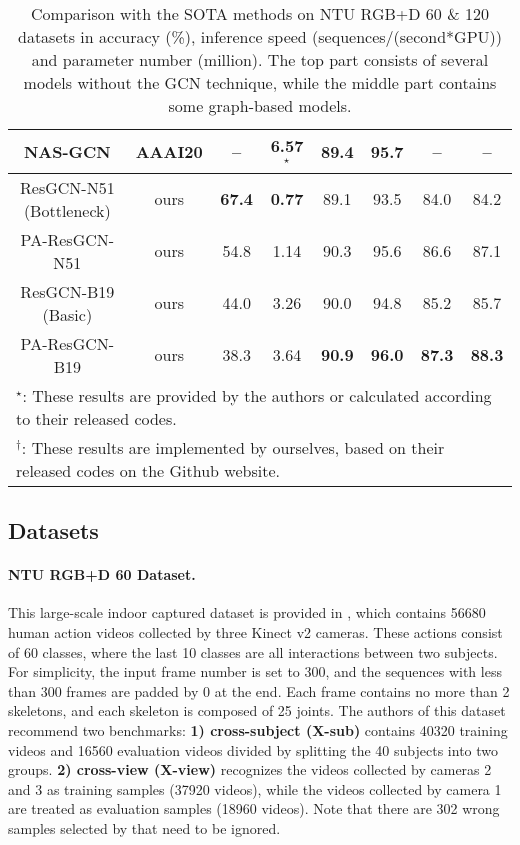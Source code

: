 \documentclass[sigconf]{acmart}
\begin{document}
\begin{table*}
\begin{center}
\begin{tabular}{cc|cc|cc|cc}
  NAS-GCN \cite{peng2020learning} & AAAI20 & -- & 6.57$^\star$ & 89.4 & 95.7 & -- & -- \\
  \hline
  \hline
  ResGCN-N51 (Bottleneck) & ours & {\bf 67.4} & {\bf 0.77} & 89.1 & 93.5 & 84.0 & 84.2 \\
  PA-ResGCN-N51 & ours & 54.8 & 1.14 & 90.3 & 95.6 & 86.6 & 87.1 \\
  \hline
  ResGCN-B19 (Basic) & ours & 44.0 & 3.26 & 90.0 & 94.8 & 85.2 & 85.7 \\
  PA-ResGCN-B19 & ours & 38.3 & 3.64 & {\bf 90.9} & {\bf 96.0} & {\bf 87.3} & {\bf 88.3} \\
  \hline
  \multicolumn{8}{l}{$^\star$: These results are provided by the authors or calculated according to their released codes.}\\
  \multicolumn{8}{l}{$^\dagger$: These results are implemented by ourselves, based on their released codes on the Github website.}\\
  \end{tabular}
  \end{center}
  \caption{Comparison with the SOTA methods on NTU RGB+D 60 \& 120 datasets in accuracy (\%), inference speed (sequences/(second*GPU)) and parameter number (million). The top part consists of several models without the GCN technique, while the middle part contains some graph-based models.}\label{tab:ntu}
  \vspace{-0.6cm}
\end{table*}

\subsection{Datasets}
\label{ssec:datasets}

\paragraph{NTU RGB+D 60 Dataset.} This large-scale indoor captured dataset is provided in \cite{shahroudy2016ntu}, which contains 56680 human action videos collected by three Kinect v2 cameras. These actions consist of 60 classes, where the last 10 classes are all interactions between two subjects. For simplicity, the input frame number is set to 300, and the sequences with less than 300 frames are padded by 0 at the end. Each frame contains no more than 2 skeletons, and each skeleton is composed of 25 joints. The authors of this dataset recommend two benchmarks: {\bf 1) cross-subject (X-sub)} contains 40320 training videos and 16560 evaluation videos divided by splitting the 40 subjects into two groups. {\bf 2) cross-view (X-view)} recognizes the videos collected by cameras 2 and 3 as training samples (37920 videos), while the videos collected by camera 1 are treated as evaluation samples (18960 videos). Note that there are 302 wrong samples selected by \cite{liu2019ntu} that need to be ignored.
\end{document}
